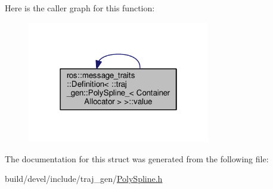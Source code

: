 Here is the caller graph for this function\+:
\nopagebreak
\begin{figure}[H]
\begin{center}
\leavevmode
\includegraphics[width=226pt]{structros_1_1message__traits_1_1_definition_3_01_1_1traj__gen_1_1_poly_spline___3_01_container_allocator_01_4_01_4_aa8f178e3072c77bc6465e3e4ea27476b_icgraph}
\end{center}
\end{figure}




The documentation for this struct was generated from the following file\+:\begin{DoxyCompactItemize}
\item 
build/devel/include/traj\+\_\+gen/\hyperlink{_poly_spline_8h}{Poly\+Spline.\+h}\end{DoxyCompactItemize}
